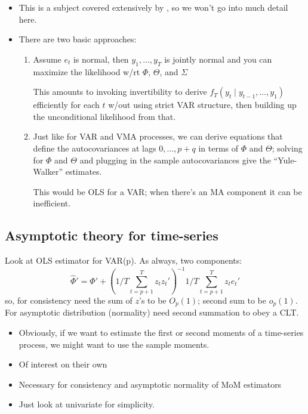 \begin{itemize}
\item This is a subject covered extensively by \citet{Ha94}, so we won't go
  into much detail here.
\item There are two basic approaches:
  \begin{enumerate}
  \item Assume $e_t$ is normal, then $y_1,\dots,y_T$ is jointly normal
    and you can maximize the likelihood w/rt $\Phi$, $\Theta$, and
    $\Sigma$

    This amounts to invoking invertibility to derive $f_T(y_t ∣
    y_{t-1},\dots,y_1)$ efficiently for each $t$ w/out using strict
    VAR structure, then building up the unconditional likelihood from
    that.

  \item Just like for VAR and VMA processes, we can derive equations
    that define the autocovariances at lags $0,\dots,p+q$ in terms of
    $\Phi$ and $\Theta$; solving for $\Phi$ and $\Theta$ and plugging
    in the sample autocovariances give the ``Yule-Walker'' estimates.

    This would be OLS for a VAR; when there's an MA component it can
    be inefficient.
  \end{enumerate}
\end{itemize}

\subsection{Asymptotic theory for time-series}

Look at OLS estimator for VAR(p). As always, two components:
\[\hat \Phi' = \Phi' + (1/T \sum_{t=p+1}^T z_t z_t')^{-1} 1/T
\sum_{t=p+1}^T z_t e_t'\] so, for consistency need the sum of $z$'s to be
$O_p(1)$; second sum to be $o_p(1)$. For asymptotic distribution
(normality) need second summation to obey a CLT.

\begin{itemize}
\item Obviously, if we want to estimate the first or second moments of
  a time-series process, we might want to use the sample moments.
\item Of interest on their own
\item Necessary for consistency and asymptotic normality of MoM
  estimators
\item Just look at univariate for simplicity.
\end{itemize}

